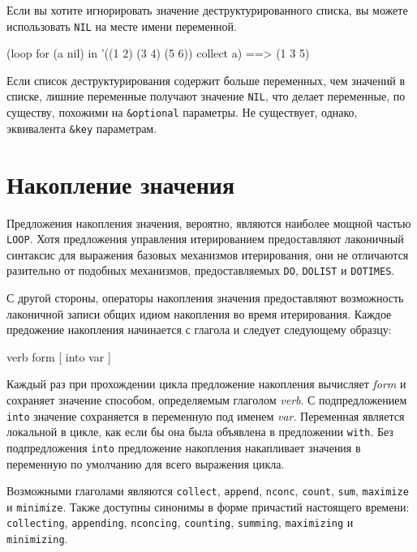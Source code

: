 Если вы хотите игнорировать значение деструктурированного списка, вы можете использовать
\lstinline{NIL} на месте имени переменной.

\begin{myverb}
  (loop for (a nil) in '((1 2) (3 4) (5 6)) collect a) ==> (1 3 5)
\end{myverb}

Если список деструктурирования содержит больше переменных, чем значений в списке, лишние
переменные получают значение \lstinline{NIL}, что делает переменные, по существу, похожими на
\lstinline!&optional! параметры. Не существует, однако, эквивалента \lstinline!&key!
параметрам.

\section{Накопление значения}

Предложения накопления значения, вероятно, являются наиболее мощной частью
\lstinline{LOOP}. Хотя предложения управления итерированием предоставляют лаконичный
синтаксис для выражения базовых механизмов итерирования, они не отличаются разительно от
подобных механизмов, предоставляемых \lstinline{DO}, \lstinline{DOLIST} и \lstinline{DOTIMES}.

С другой стороны, операторы накопления значения предоставляют возможность лаконичной
записи общих идиом накопления во время итерирования. Каждое предожение накопления
начинается с глагола и следует следующему образцу:

\begin{myverb}
verb form [ into var ]
\end{myverb}

Каждый раз при прохождении цикла предложение накопления вычисляет \textit{form} и
сохраняет значение способом, определяемым глаголом \textit{verb}. С подпредложением
\lstinline{into} значение сохраняется в переменную под именем \textit{var}. Переменная является
локальной в цикле, как если бы она была объявлена в предложении \lstinline{with}. Без
подпредложения \lstinline{into} предложение накопления накапливает значения в переменную по
умолчанию для всего выражения цикла.

Возможными глаголами являются \lstinline{collect}, \lstinline{append}, \lstinline{nconc}, \lstinline{count},
\lstinline{sum}, \lstinline{maximize} и \lstinline{minimize}. Также доступны синонимы в форме причастий
настоящего времени: \lstinline{collecting}, \lstinline{appending}, \lstinline{nconcing}, \lstinline{counting},
\lstinline{summing}, \lstinline{maximizing} и \lstinline{minimizing}.

